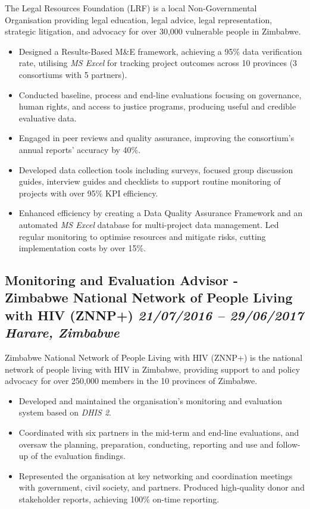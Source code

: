 \documentclass[
  10pt,
]{article}
\providecommand{\tightlist}{%
  \setlength{\itemsep}{0pt}\setlength{\parskip}{0pt}}
\begin{document}
The Legal Resources Foundation (LRF) is a local Non-Governmental Organisation providing legal education, legal advice, legal representation, strategic litigation, and advocacy for over 30,000 vulnerable people in Zimbabwe.

\begin{itemize}
\tightlist
\item
Designed a Results-Based M\&E framework, achieving a 95\% data verification rate, utilising \emph{MS Excel} for tracking project outcomes across 10 provinces (3 consortiums with 5 partners).
\item
Conducted baseline, process and end-line evaluations focusing on governance, human rights, and access to justice programs, producing useful and credible evaluative data.
\item
Engaged in peer reviews and quality assurance, improving the consortium's annual reports' accuracy by 40\%.
\item
Developed data collection tools including surveys, focused group discussion guides, interview guides and checklists to support routine monitoring of projects with over 95\% KPI efficiency.
\item
Enhanced efficiency by creating a Data Quality Assurance Framework and an automated \emph{MS Excel} database for multi-project data management. Led regular monitoring to optimise resources and mitigate risks, cutting implementation costs by over 15\%.
\end{itemize}

\subsection{\texorpdfstring{Monitoring and Evaluation Advisor - Zimbabwe
National Network of People Living with HIV (ZNNP+) \emph{21/07/2016 --
29/06/2017} \textbar{} \emph{Harare, Zimbabwe}}{Monitoring and Evaluation Advisor - Zimbabwe National Network of People Living with HIV (ZNNP+) 21/07/2016 -- 29/06/2017 \textbar{} Harare, Zimbabwe}}\label{monitoring-and-evaluation-advisor---zimbabwe-national-network-of-people-living-with-hiv-znnp-21072016-29062017-harare-zimbabwe}

Zimbabwe National Network of People Living with HIV (ZNNP+) is the national network of people living with HIV in Zimbabwe, providing support to and policy advocacy for over 250,000 members in the 10 provinces of Zimbabwe.

\begin{itemize}
\tightlist
\item
Developed and maintained the organisation's monitoring and evaluation system based on \emph{DHIS 2}.
\item
Coordinated with six partners in the mid-term and end-line evaluations, and oversaw the planning, preparation, conducting, reporting and use and follow-up of the evaluation findings.
\item
Represented the organisation at key networking and coordination meetings with government, civil society, and partners. Produced high-quality donor and stakeholder reports, achieving 100\% on-time reporting.
\end{itemize}
\end{document}

